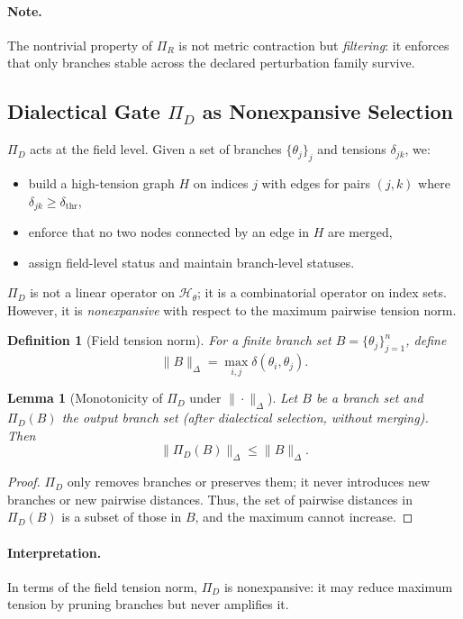 \documentclass[11pt, a4paper]{article}
\newtheorem{lemma}[theorem]{Lemma}
\newtheorem{definition}{Definition}
\begin{document}
\paragraph{Note.}
The nontrivial property of $\Pi_R$ is not metric contraction but \emph{filtering}: it enforces that only branches stable across the declared perturbation family survive.

\subsection{Dialectical Gate $\Pi_D$ as Nonexpansive Selection}

$\Pi_D$ acts at the field level.
Given a set of branches $\{\theta_j\}_j$ and tensions $\delta_{jk}$, we:
\begin{itemize}[nosep]
  \item build a high-tension graph $H$ on indices $j$ with edges for pairs $(j,k)$ where $\delta_{jk} \ge \delta_{\mathrm{thr}}$,
  \item enforce that no two nodes connected by an edge in $H$ are merged,
  \item assign field-level status and maintain branch-level statuses.
\end{itemize}

$\Pi_D$ is not a linear operator on $\mathcal{H}_\theta$; it is a combinatorial operator on index sets.
However, it is \emph{nonexpansive} with respect to the maximum pairwise tension norm.

\begin{definition}[Field tension norm]
For a finite branch set $B=\{\theta_j\}_{j=1}^n$, define
\[
\|B\|_{\Delta} = \max_{i,j} \delta(\theta_i,\theta_j).
\]
\end{definition}

\begin{lemma}[Monotonicity of $\Pi_D$ under $\|\cdot\|_{\Delta}$]
Let $B$ be a branch set and $\Pi_D(B)$ the output branch set (after dialectical selection, without merging).
Then
\[
\|\Pi_D(B)\|_{\Delta} \le \|B\|_{\Delta}.
\]
\end{lemma}

\begin{proof}
$\Pi_D$ only removes branches or preserves them; it never introduces new branches or new pairwise distances.
Thus, the set of pairwise distances in $\Pi_D(B)$ is a subset of those in $B$, and the maximum cannot increase.
\end{proof}

\paragraph{Interpretation.}
In terms of the field tension norm, $\Pi_D$ is nonexpansive: it may reduce maximum tension by pruning branches but never amplifies it.
\end{document}
